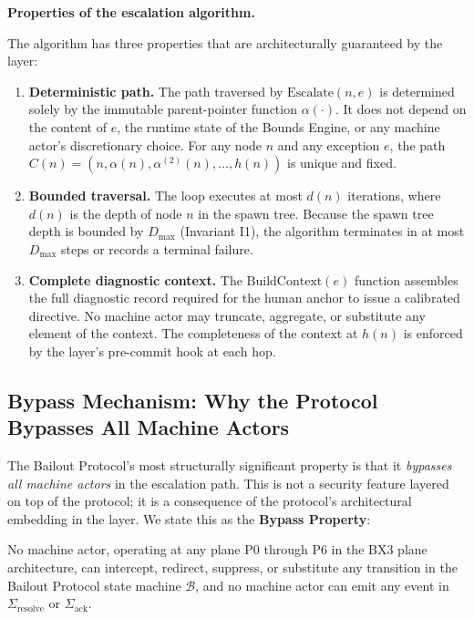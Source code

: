 \medskip
\noindent\textbf{Properties of the escalation algorithm.}

The algorithm has three properties that are architecturally guaranteed by the \fact{} layer:

\begin{enumerate}\itemsep=0pt
\item \textbf{Deterministic path.} The path traversed by $\text{Escalate}(n, e)$ is determined solely by the immutable parent-pointer function $\alpha(\cdot)$. It does not depend on the content of $e$, the runtime state of the Bounds Engine, or any machine actor's discretionary choice. For any node $n$ and any exception $e$, the path $C(n) = (n, \alpha(n), \alpha^{(2)}(n), \ldots, h(n))$ is unique and fixed.

\item \textbf{Bounded traversal.} The loop executes at most $d(n)$ iterations, where $d(n)$ is the depth of node $n$ in the spawn tree. Because the spawn tree depth is bounded by $D_{\max}$ (Invariant I1), the algorithm terminates in at most $D_{\max}$ steps or records a terminal failure.

\item \textbf{Complete diagnostic context.} The $\text{BuildContext}(e)$ function assembles the full diagnostic record required for the human anchor to issue a calibrated directive. No machine actor may truncate, aggregate, or substitute any element of the context. The completeness of the context at $h(n)$ is enforced by the \fact{} layer's pre-commit hook at each hop.
\end{enumerate}

\subsection{Bypass Mechanism: Why the Protocol Bypasses All Machine Actors}
\label{sec:bypass-mechanism}

The Bailout Protocol's most structurally significant property is that it \emph{bypasses all machine actors} in the escalation path. This is not a security feature layered on top of the protocol; it is a consequence of the protocol's architectural embedding in the \fact{} layer. We state this as the \textbf{Bypass Property}:

\begin{definition}
\label{def:bypass}
No machine actor, operating at any plane P0 through P6 in the BX3 plane architecture, can intercept, redirect, suppress, or substitute any transition in the Bailout Protocol state machine $\mathcal{B}$, and no machine actor can emit any event in $\Sigma_{\text{resolve}}$ or $\Sigma_{\text{ack}}$.
\end{definition}

